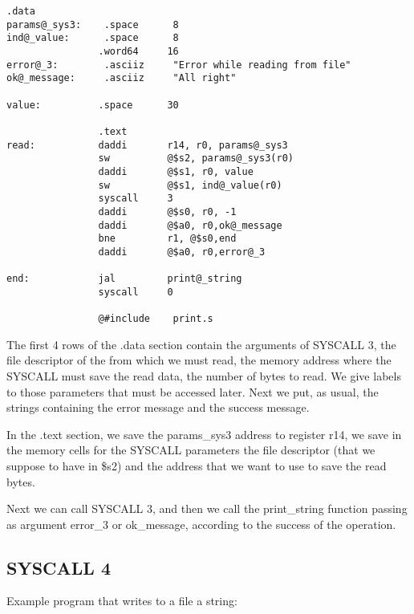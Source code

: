\documentclass[letterpaper,10pt,english]{sphinxmanual}
\begin{document}
\begin{Verbatim}[commandchars=@\[\]]
                .data
params@_sys3:    .space      8
ind@_value:      .space      8
                .word64     16
error@_3:        .asciiz     "Error while reading from file"
ok@_message:     .asciiz     "All right"

value:          .space      30

                .text
read:           daddi       r14, r0, params@_sys3
                sw          @$s2, params@_sys3(r0)
                daddi       @$s1, r0, value
                sw          @$s1, ind@_value(r0)
                syscall     3
                daddi       @$s0, r0, -1
                daddi       @$a0, r0,ok@_message
                bne         r1, @$s0,end
                daddi       @$a0, r0,error@_3

end:            jal         print@_string
                syscall     0

                @#include    print.s
\end{Verbatim}

The first 4 rows of the .data section contain the arguments of SYSCALL 3, the file
descriptor of the from which we must read, the memory address where the SYSCALL
must save the read data, the number of bytes to read. We give labels to those
parameters that must be accessed later.  Next we put, as usual, the strings
containing the error message and the success message.

In the .text section, we save the params\_sys3 address to register r14, we save
in the memory cells for the SYSCALL parameters the file descriptor (that we
suppose to have in \$s2) and the address that we want to use to save the read
bytes.

Next we can call SYSCALL 3, and then we call the print\_string function passing as
argument error\_3 or ok\_message, according to the success of the operation.


\subsection{SYSCALL 4}
\label{examples:syscall-4}
Example program that writes to a file a string:
\end{document}
